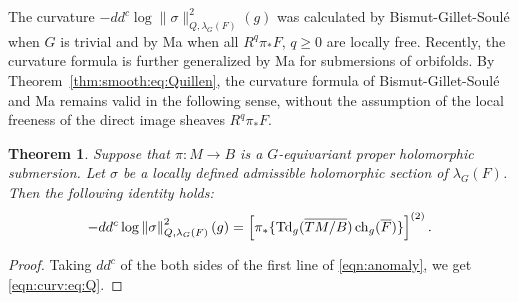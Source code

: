 \documentclass[amscd, leqno]{amsart}
\theoremstyle{plain}
\newtheorem{theorem}{Theorem}[section]
\theoremstyle{definition}
\theoremstyle{remark}
\newenvironment{pf}{\begin{proof}}{\end{proof}}
\begin{document}
The curvature $-dd^{c}\log\|\sigma\|^{2}_{Q,\lambda_{G}(F)}(g)$ was calculated by Bismut-Gillet-Soul\'e \cite[Th.\,0.1]{BGS88} 
when $G$ is trivial and by Ma \cite[Th.\,2.12]{Ma00} when all $R^{q}\pi_{*}F$, $q\geq0$ are locally free. 
Recently, the curvature formula is further generalized by Ma \cite[Th.\,3.6]{Ma21} for submersions of orbifolds.
By Theorem~\ref{thm:smooth:eq:Quillen}, the curvature formula of Bismut-Gillet-Soul\'e and Ma remains valid in the following sense, 
without the assumption of the local freeness of the direct image sheaves $R^{q}\pi_{*}F$.


\begin{theorem}
\label{thm:curvature}
Suppose that $\pi \colon M \to B$ is a $G$-equivariant proper holomorphic submersion.
Let $\sigma$ be a locally defined admissible holomorphic section of $\lambda_{G}(F)$. Then the following identity holds:
\begin{equation}
\label{eqn:curv:eq:Q}
-dd^{c} \log \left\| \sigma \right\|_{Q,\lambda_{G}(F)}^{2}(g)
=
\left[\pi_{*}\{{\rm Td}_{g}(\overline{TM/B})\,{\rm ch}_{g}(\overline{F})\}\right]^{(2)}.
\end{equation}
\end{theorem}

\begin{pf}
Taking $dd^{c}$ of the both sides of the first line of \eqref{eqn:anomaly}, we get \eqref{eqn:curv:eq:Q}.
\end{pf}






\end{document}
